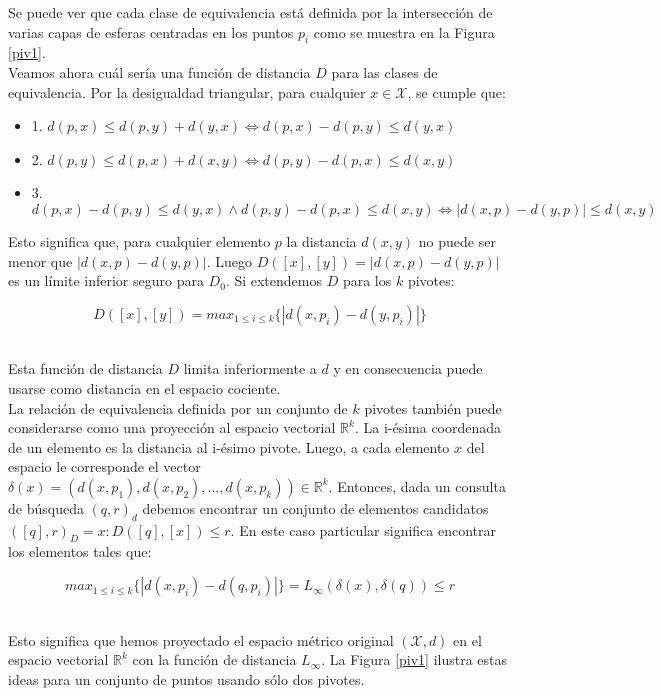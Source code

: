 Se puede ver que cada clase de equivalencia est\'a definida por la intersecci\'on de varias capas de esferas centradas en los puntos $p_i$ como se muestra en la Figura \ref{piv1}.\\

Veamos ahora cu\'al ser\'ia una funci\'on de distancia $D$ para las clases de equivalencia.  Por la desigualdad triangular, para cualquier $x \in \mathcal{X}$, se cumple que:

\begin{itemize}
\item 1. $d(p,x) \leq d(p,y) + d(y,x) \Leftrightarrow d(p,x) - d(p,y) \leq d(y,x)$
\item 2. $d(p,y) \leq d(p,x) + d(x,y) \Leftrightarrow d(p,y) - d(p,x) \leq d(x,y)$
\item 3. $d(p,x) - d(p,y) \leq d(y,x) \wedge d(p,y) - d(p,x) \leq d(x,y) \Leftrightarrow |d(x,p) - d(y,p)| \leq d(x,y)$
\end{itemize}

Esto significa que, para cualquier elemento $p$ la distancia $d(x,y)$ no puede ser menor que $|d(x,p) - d(y,p)|$. Luego  $D([x],[y]) = |d(x,p) - d(y,p)|$  es un l\'imite inferior seguro para $D_0$. Si extendemos $D$ para los $k$ pivotes:

\[
D([x],[y]) = max_{1 \leq i \leq k} \{ |d(x,p_i) - d(y,p_i)|\} 
\]
\

Esta funci\'on de distancia $D$ limita inferiormente a $d$ y en consecuencia puede usarse como distancia en el espacio cociente.\\

La relaci\'on de equivalencia definida por un conjunto de $k$ pivotes tambi\'en puede considerarse como una proyecci\'on al espacio vectorial $\mathbb R^k$. La i-\'esima coordenada de un elemento es la distancia al i-\'esimo pivote. Luego, a cada elemento $x$ del espacio le corresponde el vector  $\delta(x) = (d(x,p_1),d(x,p_2),...,d(x,p_k)) \in \mathbb R^k$. Entonces, dada un consulta de b\'usqueda $(q,r)_d$ debemos encontrar un conjunto de elementos candidatos $([q],r)_D = x : D([q],[x]) \leq r$. En este caso particular significa encontrar los elementos tales que:

\[
max_{1 \leq i \leq k} \{ |d(x,p_i) - d(q,p_i)| \} = L_{\infty}(\delta(x),\delta(q)) \leq r 
\]
\

Esto significa que hemos proyectado el espacio m\'etrico original $(\mathcal{X}, d)$ en el espacio vectorial $\mathbb R^k$ con la funci\'on de distancia $L_{\infty}$. La Figura \ref{piv1}  ilustra estas ideas para un conjunto de puntos usando s\'olo dos pivotes.

